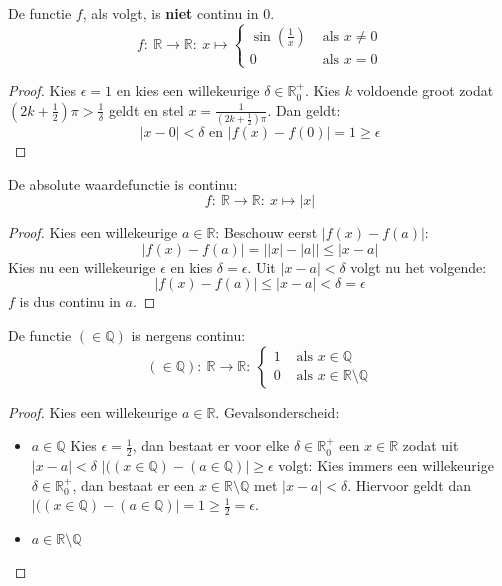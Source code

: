 \documentclass[main.tex]{subfiles}
\begin{document}
\begin{tvb}
  De functie $f$, als volgt, is \textbf{niet} continu in $0$.
  \[
  f:\  \mathbb{R} \rightarrow \mathbb{R}:\ x \mapsto 
  \begin{cases}
    \sin\left(\frac{1}{x}\right) &\text{ als } x \neq 0\\
    0 &\text{ als } x = 0
  \end{cases}
  \]

  \begin{proof}
  Kies $\epsilon = 1$ en kies een willekeurige $\delta \in \mathbb{R}_{0}^{+}$.
  Kies $k$ voldoende groot zodat $\left(2k+\frac{1}{2}\right)\pi > \frac{1}{\delta}$ geldt en stel $x = \frac{1}{\left(2k+\frac{1}{2}\right)\pi}$.
  Dan geldt:
  \[ |x-0| < \delta \text{ en } |f(x)-f(0)| = 1 \ge \epsilon \]
  \end{proof}
\end{tvb}

\begin{vb}
  De absolute waardefunctie is continu:
  \[ f:\ \mathbb{R} \rightarrow \mathbb{R}:\ x \mapsto |x| \]

  \begin{proof}
    Kies een willekeurige $a\in \mathbb{R}$:
    Beschouw eerst $|f(x)-f(a)|$:
    \[ |f(x)-f(a)| = \left||x|-|a|\right| \le |x-a| \]
    Kies nu een willekeurige $\epsilon$ en kies $\delta = \epsilon$.
    Uit $|x-a| <\delta$ volgt nu het volgende:
    \[ |f(x)-f(a)| \le |x-a| < \delta = \epsilon \]
    $f$ is dus continu in $a$.
  \end{proof}
\end{vb}

\begin{vb}
  De functie $(\in \mathbb{Q})$ is nergens continu:
  \[
  (\in \mathbb{Q}):\ \mathbb{R} \rightarrow \mathbb{R}:\ 
  \left\{
    \begin{array}{rl}
      1 &\text{ als } x\in \mathbb{Q}\\
      0 &\text{ als } x\in \mathbb{R}\setminus \mathbb{Q}
    \end{array}
  \right.
  \]
  
  \begin{proof}
    Kies een willekeurige $a \in \mathbb{R}$.
    Gevalsonderscheid:
    \begin{itemize}
    \item $a\in \mathbb{Q}$
      Kies $\epsilon = \frac{1}{2}$, dan bestaat er voor elke $\delta \in \mathbb{R}_{0}^{+}$ een $x\in \mathbb{R}$ zodat uit $|x-a| < \delta$ $|((x \in \mathbb{Q})-(a\in \mathbb{Q})| \ge \epsilon$ volgt:
      Kies immers een willekeurige $\delta \in \mathbb{R}_{0}^{+}$, dan bestaat er een $x\in \mathbb{R}\setminus \mathbb{Q}$ met $|x-a| < \delta$. \needed
      Hiervoor geldt dan $|((x \in \mathbb{Q})-(a\in \mathbb{Q})| = 1 \ge \frac{1}{2} = \epsilon$.
    \item $a\in \mathbb{R}\setminus \mathbb{Q}$
    \end{itemize}
  \end{proof}
\end{vb}
\end{document}
